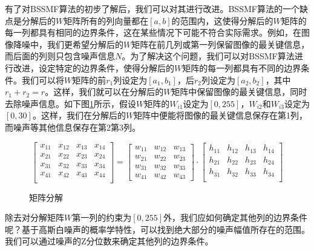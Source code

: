 \documentclass[12pt]{article}
\begin{document}
有了对BSSMF算法的初步了解后，我们可以对其进行改进。BSSMF算法的一个缺点是分解后的$W$矩阵所有的列向量都在$[a,b]$的范围内，这使得分解后的$W$矩阵的每一列都具有相同的边界条件，这在某些情况下可能不符合实际需求。例如，在图像降噪中，我们更希望分解后的$W$矩阵在前几列或第一列保留图像的最关键信息，而后面的列则只包含噪声信息$N$。为了解决这个问题，我们可以对BSSMF算法进行改进，设定特定的边界条件，使得分解后的$W$矩阵的每一列都具有不同的边界条件。我们可以将$W$矩阵的前$r_1$列设定为$[a_1,b_1]$，后$r_2$列设定为$[a_2,b_2]$，其中$r_1+r_2=r$。这样，我们就可以在分解后的$W$矩阵中保留图像的最关键信息，同时去除噪声信息。如下图\ref{fig:matrix_decomposition}所示，假设$W$矩阵的$W_{i1}$设定为$[0,255]$，$W_{i2}$和$W_{i3}$设定为$[0,30]$。这样，我们在分解后的$W$矩阵中便能将图像的最关键信息保存在第1列，而噪声等其他信息保存在第2第3列。
\begin{figure}[H]
    \centering
    \begin{equation*}
        \begin{bmatrix}
            x_{11} & x_{12} & x_{13} & x_{14} \\
            x_{21} & x_{22} & x_{23} & x_{24} \\
            x_{31} & x_{32} & x_{33} & x_{34} \\
            x_{41} & x_{42} & x_{43} & x_{44} \\
        \end{bmatrix}
        =
        \begin{bmatrix}
            w_{11} & w_{12} & w_{13}\\
            w_{21} & w_{22} & w_{23} \\
            w_{31} & w_{32} & w_{33} \\
            w_{41} & w_{42} & w_{43}

        \end{bmatrix}
        \cdot
        \begin{bmatrix}
            h_{11} & h_{12} & h_{13} & h_{14} \\
            h_{21} & h_{22} & h_{23} & h_{24} \\
            h_{31} & h_{32} & h_{33} & h_{34} \\
        \end{bmatrix}
    \end{equation*}
    \caption{矩阵分解}
    \label{fig:matrix_decomposition}
\end{figure}

除去对分解矩阵$W$第一列的约束为$[0,255]$外，我们应如何确定其他列的边界条件呢？基于高斯白噪声的概率学特性，可以找到绝大部分的噪声幅值所存在的范围。我们可以通过噪声的Z分位数来确定其他列的边界条件。
\end{document}
